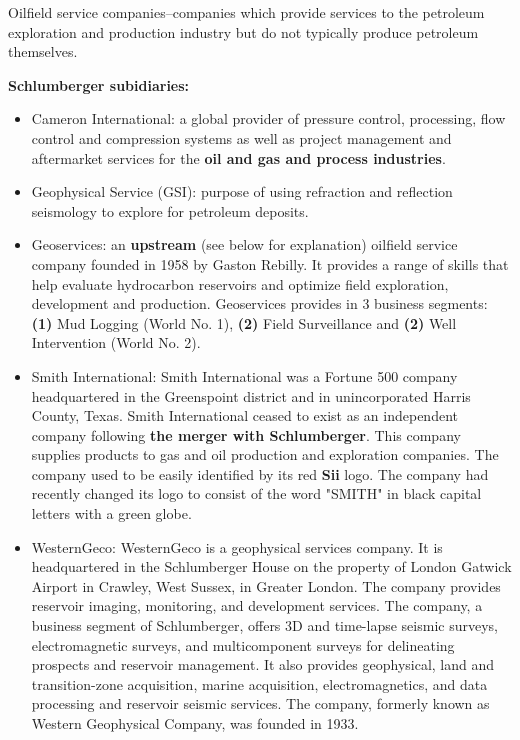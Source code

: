 \documentclass[12pt,a4paper]{article}
\begin{document}
Oilfield service companies--companies which provide services to the
petroleum exploration and production industry but do not typically produce
petroleum themselves. 

\textbf{Schlumberger subidiaries:}
\begin{itemize}[noitemsep,topsep=0pt]
\item Cameron International: a global provider of pressure control,
  processing, flow control and compression systems as well as project
  management and aftermarket services for the \textbf{oil and gas and
    process industries}.
\item Geophysical Service (GSI): purpose of using refraction and reflection
  seismology to explore for petroleum deposits.
\item Geoservices: an \textbf{upstream} (see below for explanation) oilfield
  service company founded in 1958 by Gaston Rebilly. It provides a range of
  skills that help evaluate hydrocarbon reservoirs and optimize field
  exploration, development and production. Geoservices provides in 3
  business segments: \textbf{(1)} Mud Logging (World No. 1), \textbf{(2)}
  Field Surveillance and \textbf{(2)} Well Intervention (World No. 2).
\item Smith International: Smith International was a Fortune 500 company
  headquartered in the Greenspoint district and in unincorporated Harris
  County, Texas. Smith International ceased to exist as an independent
  company following \textbf{the merger with Schlumberger}. This company
  supplies products to gas and oil production and exploration companies. The
  company used to be easily identified by its red \textbf{Sii} logo. The
  company had recently changed its logo to consist of the word "SMITH" in
  black capital letters with a green globe.
\item WesternGeco: WesternGeco is a geophysical services company. It is
  headquartered in the Schlumberger House on the property of London Gatwick
  Airport in Crawley, West Sussex, in Greater London. The company provides
  reservoir imaging, monitoring, and development services. The company, a
  business segment of Schlumberger, offers 3D and time-lapse seismic
  surveys, electromagnetic surveys, and multicomponent surveys for
  delineating prospects and reservoir management. It also provides
  geophysical, land and transition-zone acquisition, marine acquisition,
  electromagnetics, and data processing and reservoir seismic services. The
  company, formerly known as Western Geophysical Company, was founded in
  1933.
\end{itemize}
\end{document}
